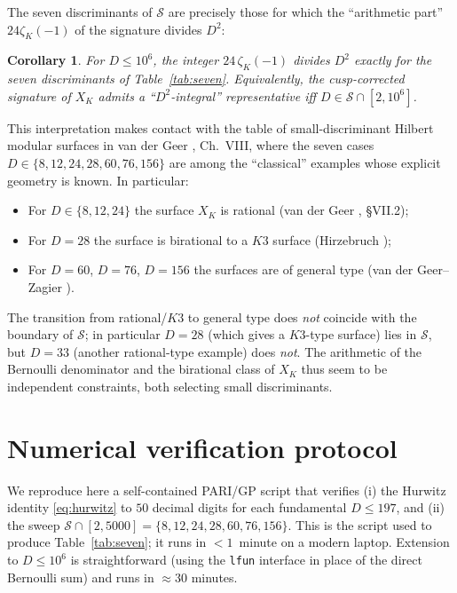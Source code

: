 \documentclass[11pt,reqno]{amsart}
\theoremstyle{plain}
\newtheorem{corollary}[theorem]{Corollary}
\theoremstyle{definition}
\begin{document}
The seven discriminants of $\mathcal{S}$ are precisely those for which the
``arithmetic part'' $24\zeta_{K}(-1)$ of the signature divides
$D^{2}$:

\begin{corollary}\label{cor:hms}
For $D\le 10^{6}$, the integer $24\,\zeta_{K}(-1)$ divides $D^{2}$
exactly for the seven discriminants of Table~\ref{tab:seven}.  Equivalently,
the cusp-corrected signature of $X_{K}$ admits a ``$D^{2}$-integral''
representative iff $D\in\mathcal{S}\cap[2,10^{6}]$.
\end{corollary}

This interpretation makes contact with the table of small-discriminant
Hilbert modular surfaces in van der Geer \cite{vanderGeer1988},
Ch.~VIII, where the seven cases $D\in\{8,12,24,28,60,76,156\}$ are
among the ``classical'' examples whose explicit geometry is known.
In particular:
\begin{itemize}
\item For $D\in\{8,12,24\}$ the surface $X_{K}$ is rational (van der Geer
\cite{vanderGeer1988}, \S VII.2);
\item For $D=28$ the surface is birational to a $K3$ surface (Hirzebruch
\cite{Hirzebruch1977});
\item For $D=60$, $D=76$, $D=156$ the surfaces are of general type
(van der Geer--Zagier \cite{vanderGeerZagier1977}).
\end{itemize}
The transition from rational/$K3$ to general type does \emph{not}
coincide with the boundary of $\mathcal{S}$; in particular $D=28$ (which gives
a $K3$-type surface) lies in $\mathcal{S}$, but $D=33$ (another rational-type
example) does \emph{not}.  The arithmetic of the Bernoulli denominator
and the birational class of $X_{K}$ thus seem to be independent
constraints, both selecting small discriminants.

\section{Numerical verification protocol}\label{sec:numerical}

We reproduce here a self-contained PARI/GP \cite{PARI} script that
verifies (i) the Hurwitz identity \eqref{eq:hurwitz} to $50$ decimal
digits for each fundamental $D\le 197$, and (ii) the sweep
$\mathcal{S}\cap[2,5000]=\{8,12,24,28,60,76,156\}$.  This is the script
used to produce Table~\ref{tab:seven}; it runs in $< 1$~minute on a
modern laptop.  Extension to $D\le 10^{6}$ is straightforward
(using the \texttt{lfun} interface in place of the direct Bernoulli
sum) and runs in $\approx 30$ minutes.
\end{document}
